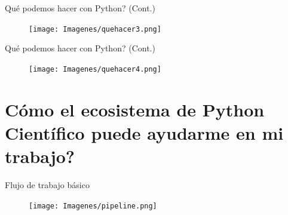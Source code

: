 \documentclass[bigger]{beamer}
\begin{document}
\begin{frame}{Qu\'e podemos hacer con Python? (Cont.)}

 \begin{figure}[h]
        \texttt{[image: Imagenes/quehacer3.png]}
\end{figure}
\end{frame}


\begin{frame}{Qu\'e podemos hacer con Python? (Cont.)}

 \begin{figure}[h]
        \texttt{[image: Imagenes/quehacer4.png]}
\end{figure}
\end{frame}


\section{Cómo el ecosistema de Python Científico puede ayudarme en mi trabajo?}
\begin{frame}{Flujo de trabajo básico}
 \begin{figure}[h]
        \texttt{[image: Imagenes/pipeline.png]}
\end{figure}
\end{frame}
\end{document}
